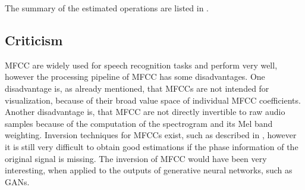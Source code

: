 The summary of the estimated operations are listed in .




\subsection{Criticism}
\thesisStateNew
MFCC are widely used for speech recognition tasks and perform very well, however the processing pipeline of MFCC has some disadvantages.
One disadvantage is, as already mentioned, that MFCCs are not intended for visualization, because of their broad value space of individual MFCC coefficients.
Another disadvantage is, that MFCC are not directly invertible to raw audio samples because of the computation of the spectrogram and its Mel band weighting.
Inversion techniques for MFCCs exist, such as described in \cite{Boucheron2008}, however it is still very difficult to obtain good estimations if the phase information of the original signal is missing.
The inversion of MFCC would have been very interesting, when applied to the outputs of generative neural networks, such as GANs.